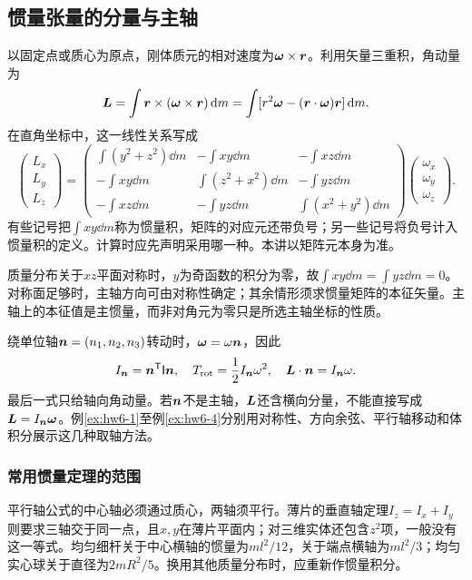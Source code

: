 

\subsection{惯量张量的分量与主轴}
\label{sec:complete6}
以固定点或质心为原点，刚体质元的相对速度为$\bm{\omega}\times\bm{r}$。利用矢量三重积，角动量为
\[
 \bm{L}=\int\bm{r}\times(\bm{\omega}\times\bm{r})\mathop{}\!\mathrm d m
 =\int[r^2\bm{\omega}-(\bm{r}\cdot\bm{\omega})\bm{r}]\mathop{}\!\mathrm d m.
\]
在直角坐标中，这一线性关系写成
\[
 \begin{pmatrix}L_x\\L_y\\L_z\end{pmatrix}
 =\begin{pmatrix}
 \int(y^2+z^2)\dd m&-\int xy\dd m&-\int xz\dd m\\
 -\int xy\dd m&\int(z^2+x^2)\dd m&-\int yz\dd m\\
 -\int xz\dd m&-\int yz\dd m&\int(x^2+y^2)\dd m
 \end{pmatrix}
 \begin{pmatrix}\omega_x\\\omega_y\\\omega_z\end{pmatrix}.
\]
有些记号把$\int xy\dd m$称为惯量积，矩阵的对应元还带负号；另一些记号将负号计入惯量积的定义。计算时应先声明采用哪一种。本讲以矩阵元本身为准。

质量分布关于$xz$平面对称时，$y$为奇函数的积分为零，故$\int xy\dd m=\int yz\dd m=0$。对称面足够时，主轴方向可由对称性确定；其余情形须求惯量矩阵的本征矢量。主轴上的本征值是主惯量，而非对角元为零只是所选主轴坐标的性质。

绕单位轴$\bm{n}=(n_1,n_2,n_3)$转动时，$\bm{\omega}=\omega\bm{n}$，因此
\[
 I_{\bm{n}}=\bm{n}^{\mathsf T}\mathsf I\bm{n},
 \quad T_{\rm rot}=\frac12I_{\bm{n}}\omega^2,
 \quad \bm{L}\cdot\bm{n}=I_{\bm{n}}\omega.
\]
最后一式只给轴向角动量。若$\bm{n}$不是主轴，$\bm{L}$还含横向分量，不能直接写成$\bm{L}=I_{\bm{n}}\bm{\omega}$。例\ref{ex:hw6-1}至例\ref{ex:hw6-4}分别用对称性、方向余弦、平行轴移动和体积分展示这几种取轴方法。

\subsubsection{常用惯量定理的范围}
平行轴公式的中心轴必须通过质心，两轴须平行。薄片的垂直轴定理$I_z=I_x+I_y$则要求三轴交于同一点，且$x,y$在薄片平面内；对三维实体还包含$z^2$项，一般没有这一等式。均匀细杆关于中心横轴的惯量为$ml^2/12$，关于端点横轴为$ml^2/3$；均匀实心球关于直径为$2mR^2/5$。换用其他质量分布时，应重新作惯量积分。


